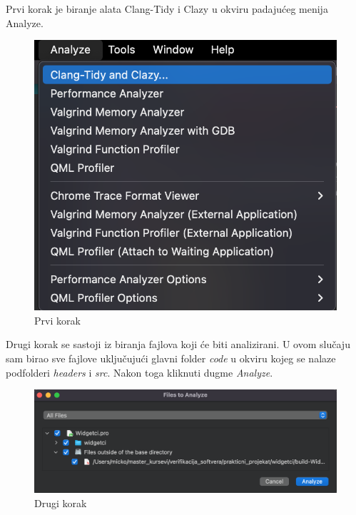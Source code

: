 \documentclass[a4paper]{article}
\begin{document}
Prvi korak je biranje alata Clang-Tidy i Clazy u okviru padajućeg menija Analyze.

\begin{figure}[h!]
\begin{center}
\includegraphics[scale=0.45]{clang-tidy-01.png}
\end{center}
\caption{Prvi korak}
\label{fig: clang-tidy-0}
\end{figure}

Drugi korak se sastoji iz biranja fajlova koji će biti analizirani. U ovom slučaju sam birao sve fajlove uključujući glavni folder \textit{code} u okviru kojeg se nalaze podfolderi \textit{headers} i \textit{src}. Nakon toga kliknuti dugme \textit{Analyze}.

\begin{figure}[h!]
\begin{center}
\includegraphics[scale=0.35]{clang-tidy-02.png}
\end{center}
\caption{Drugi korak}
\label{fig: clang-tidy-2}
\end{figure}
\end{document}
